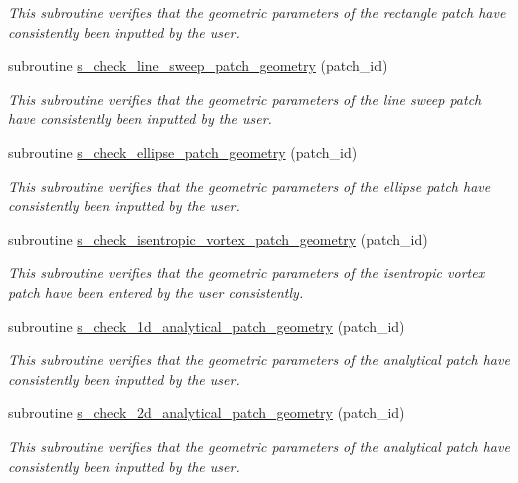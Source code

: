 \begin{DoxyCompactItemize}
\begin{DoxyCompactList}\small\item\em This subroutine verifies that the geometric parameters of the rectangle patch have consistently been inputted by the user. \end{DoxyCompactList}\item 
subroutine \hyperlink{namespacem__start__up_af838464749f53bf064afdba3c261ac83}{s\+\_\+check\+\_\+line\+\_\+sweep\+\_\+patch\+\_\+geometry} (patch\+\_\+id)
\begin{DoxyCompactList}\small\item\em This subroutine verifies that the geometric parameters of the line sweep patch have consistently been inputted by the user. \end{DoxyCompactList}\item 
subroutine \hyperlink{namespacem__start__up_a51ddc16cb3379a50fbf2957e47dbb7d5}{s\+\_\+check\+\_\+ellipse\+\_\+patch\+\_\+geometry} (patch\+\_\+id)
\begin{DoxyCompactList}\small\item\em This subroutine verifies that the geometric parameters of the ellipse patch have consistently been inputted by the user. \end{DoxyCompactList}\item 
subroutine \hyperlink{namespacem__start__up_a3fe683c4126d72deba7f8daf1ad83b94}{s\+\_\+check\+\_\+isentropic\+\_\+vortex\+\_\+patch\+\_\+geometry} (patch\+\_\+id)
\begin{DoxyCompactList}\small\item\em This subroutine verifies that the geometric parameters of the isentropic vortex patch have been entered by the user consistently. \end{DoxyCompactList}\item 
subroutine \hyperlink{namespacem__start__up_a2c3f4c2fe04814a924bff26228516a39}{s\+\_\+check\+\_\+1d\+\_\+analytical\+\_\+patch\+\_\+geometry} (patch\+\_\+id)
\begin{DoxyCompactList}\small\item\em This subroutine verifies that the geometric parameters of the analytical patch have consistently been inputted by the user. \end{DoxyCompactList}\item 
subroutine \hyperlink{namespacem__start__up_a0acb93e848d6dd38e617d4870a9b9261}{s\+\_\+check\+\_\+2d\+\_\+analytical\+\_\+patch\+\_\+geometry} (patch\+\_\+id)
\begin{DoxyCompactList}\small\item\em This subroutine verifies that the geometric parameters of the analytical patch have consistently been inputted by the user. \end{DoxyCompactList}\item 

\end{DoxyCompactItemize}

